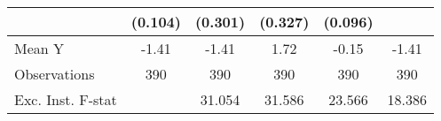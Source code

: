 {\begin{tabular}{l*{5}{c}}
            &     (0.104)         &     (0.301)         &     (0.327)         &     (0.096)         &                     \\
\midrule
Mean Y      &       -1.41         &       -1.41         &        1.72         &       -0.15         &       -1.41         \\
Observations&         390         &         390         &         390         &         390         &         390         \\
Exc. Inst. F-stat&                     &      31.054         &      31.586         &      23.566         &      18.386         \\
\bottomrule
\end{tabular}
}
